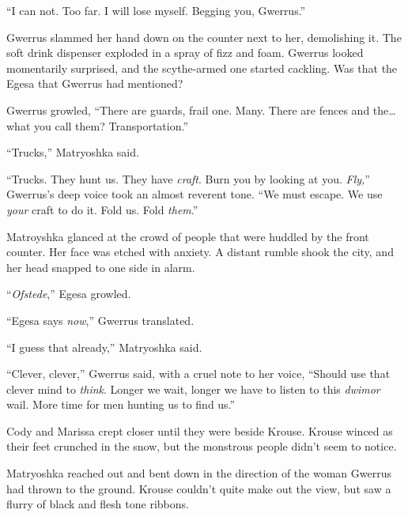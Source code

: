 ``I can not.  Too far.  I will lose myself.  Begging you, Gwerrus.''



Gwerrus slammed her hand down on the counter next to her, demolishing it.  The soft drink dispenser exploded in a spray of fizz and foam.  Gwerrus looked momentarily surprised, and the scythe-armed one started cackling.  Was that the Egesa that Gwerrus had mentioned?



Gwerrus growled, ``There are guards, frail one.  Many.  There are fences and the\ldots what you call them?  Transportation.''



``Trucks,'' Matryoshka said.



``Trucks.  They hunt us.  They have \emph{craft}.  Burn you by looking at you.  \emph{Fly,}'' Gwerrus's deep voice took an almost reverent tone.  ``We must escape.  We use \emph{your} craft to do it.  Fold us.  Fold \emph{them}.''



Matroyshka glanced at the crowd of people that were huddled by the front counter.  Her face was etched with anxiety.  A distant rumble shook the city, and her head snapped to one side in alarm.



``\emph{Ofstede},'' Egesa growled.



``Egesa says \emph{now},'' Gwerrus translated.



``I guess that already,'' Matryoshka said.



``Clever, clever,'' Gwerrus said, with a cruel note to her voice, ``Should use that clever mind to \emph{think}.  Longer we wait, longer we have to listen to this \emph{dwimor} wail.  More time for men hunting us to find us.''



Cody and Marissa crept closer until they were beside Krouse.  Krouse winced as their feet crunched in the snow, but the monstrous people didn't seem to notice.



Matryoshka reached out and bent down in the direction of the woman Gwerrus had thrown to the ground.  Krouse couldn't quite make out the view, but saw a flurry of black and flesh tone ribbons.



